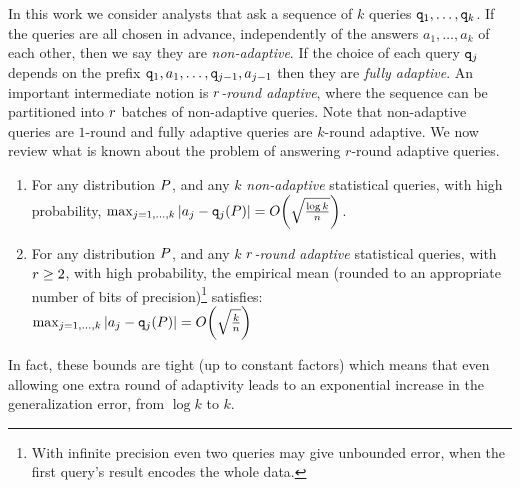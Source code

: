 In this work we consider analysts that ask a sequence of $k$ queries ${\tt q}_1,\dots,{\tt q}_k$.  If the queries are all chosen in advance, independently of the answers $a_1,\dots,a_k$ of each other, then we say they are \emph{non-adaptive}.  If the choice of each query ${\tt q}_j$ depends on the prefix ${\tt q}_1,a_1,\dots,{\tt q}_{j-1},a_{j-1}$ then they are \emph{fully adaptive}.  An important intermediate notion is \emph{$r$-round adaptive}, where the sequence can be partitioned into $r$ batches of non-adaptive queries.  Note that non-adaptive queries are $1$-round and fully adaptive queries are $k$-round adaptive.
We now review what is known about the problem of answering $r$-round adaptive queries.  
\begin{thm} 
\label{thm:nonadapt-adapt}
\begin{enumerate}

\item For any distribution $P$, and any $k$ \emph{non-adaptive} statistical queries, with high probability,
$
\max_{j=1,\dots,k} | \answer_j - \qquery_j(\dist) | = O\left( \sqrt{\frac{\log k}{n}}  \right)
$.
%
\item For any distribution $P$, and  any $k$  \emph{$r$-round adaptive} statistical queries, with $r \geq 2$, with high probability, the empirical mean (rounded to an appropriate number of bits of precision)\footnote{With infinite precision even two queries may give unbounded error, when the first query's result encodes the whole data.} satisfies:\\
$
\max_{j=1,\dots,k} | \answer_j - \qquery_j(\dist) | = O\left( \sqrt{  \frac{k}{n}}  \right)
$
\end{enumerate}
\end{thm}
In fact, these bounds are tight (up to constant factors) which means that even allowing one extra round of adaptivity leads to an exponential increase in the generalization error, from $\log k$ to $k$.


